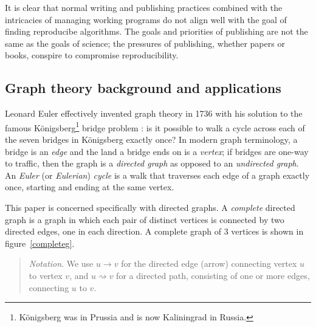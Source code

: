 \documentclass[prodmode,acmtecs]{acmsmall} %
\begin{document}
It is clear that normal writing and publishing practices combined with the intricacies of managing working programs do not align well with the goal of finding reproducibe algorithms. The goals and priorities of publishing are not the same as the goals of science; the pressures of publishing, whether papers or books, conspire to compromise reproducibility. 


\subsection{Graph theory background and applications}\label{graphtheory}

Leonard Euler effectively invented graph theory in 1736 with his solution to the famous K\"onigsberg\footnote{K\"onigsberg was in Prussia and is now Kaliningrad in Russia.} bridge problem \cite{euler,wilson}: is it possible to walk a cycle across each of the seven bridges in K\"onigsberg exactly once? In modern graph terminology, a bridge is an \emph{edge\/} and the land a bridge ends on is a \emph{vertex\/}; if bridges are one-way to traffic, then the graph is a \emph{directed graph\/} as opposed to an \emph{undirected graph\/}. An \emph{Euler\/} (or \emph{Eulerian\/}) \emph{cycle\/} is a walk that traverses each edge of a graph exactly once, starting and ending at the same vertex.%

This paper is concerned specifically with directed graphs. A \emph{complete\/} directed graph is a graph in which each pair of distinct vertices is connected by two directed edges, one in each direction. A complete graph of 3 vertices is shown in figure~\ref{completeg}. 

\begin{quote}\raggedright\emph{Notation}.
We use $u \rightarrow v$ for the directed edge (arrow) connecting vertex $u$ to vertex $v$, and $u \rightsquigarrow v$ for a directed path, consisting of one or more edges, connecting $u$ to $v$. 

\end{quote}
\end{document}
